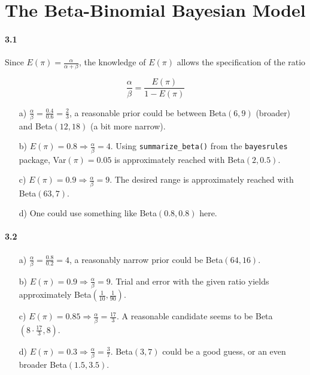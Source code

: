 \documentclass[fontsize=11pt,DIV=18,parskip=half]{scrartcl}
\begin{document}
\section{The Beta-Binomial Bayesian Model}

\paragraph{3.1}

Since $E(\pi) = \frac{\alpha}{\alpha+\beta}$, the knowledge of $E(\pi)$ allows the specification of the ratio 

\begin{equation*}
\frac{\alpha}{\beta} = \frac{E(\pi)}{1-E(\pi)}
\end{equation*}

\begin{enumerate}
\item[a)] $\frac{\alpha}{\beta} = \frac{0.4}{0.6} = \frac23$, a reasonable prior could be between Beta$(6,9)$ (broader) and Beta$(12,18)$ (a bit more narrow).
\item[b)] $E(\pi) = 0.8 \Rightarrow \frac{\alpha}{\beta} = 4$. Using \texttt{summarize\_beta()} from the \texttt{bayesrules} package, Var$(\pi) = 0.05$ is approximately reached with Beta$(2,0.5)$.
\item[c)] $E(\pi) = 0.9 \Rightarrow \frac{\alpha}{\beta} = 9$. The desired range is approximately reached with Beta$(63,7)$.
\item[d)] One could use something like Beta$(0.8, 0.8)$ here.
\end{enumerate}

\paragraph{3.2}
\begin{enumerate}
\item[a)] $\frac{\alpha}{\beta} = \frac{0.8}{0.2} = 4$, a reasonably narrow prior could be Beta$(64,16)$.
\item[b)] $E(\pi) = 0.9 \Rightarrow \frac{\alpha}{\beta} = 9$. Trial and error with the given ratio yields approximately Beta$(\frac{1}{10}, \frac{1}{90})$.
\item[c)] $E(\pi) = 0.85 \Rightarrow \frac{\alpha}{\beta} = \frac{17}{3}$. A reasonable candidate seems to be Beta$(8\cdot\frac{17}{3},8)$.
\item[d)] $E(\pi) = 0.3 \Rightarrow \frac{\alpha}{\beta} = \frac37$. Beta$(3,7)$ could be a good guess, or an even broader Beta$(1.5, 3.5)$.
\end{enumerate}
\end{document}
